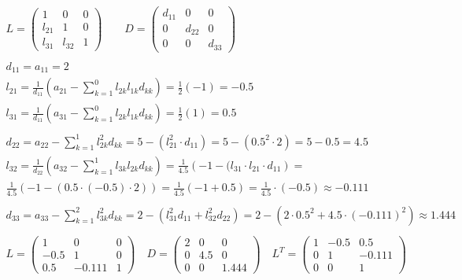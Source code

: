\documentclass[a4paper,fleqn,12pt]{article}
\begin{document}
\begin{gather*}
L = \begin{pmatrix}
1 & 0 & 0 \\
l_{21}& 1& 0 \\
l_{31} & l_{32} & 1
\end{pmatrix} \qquad 
D = \begin{pmatrix}
d_{11} & 0 & 0 \\
0 & d_{22} & 0 \\
0 & 0 & d_{33}
\end{pmatrix} \\ \\
d_{11} = a_{11} = 2 \\
l_{21} = \frac{1}{d_{11}} \left( a_{21} - \sum_{k=1} ^0 l_{2k}l_{1k}d_{kk} \right) = \frac{1}{2} (-1) = -0.5 \\
l_{31} = \frac{1}{d_{11}} \left( a_{31} - \sum_{k=1} ^0 l_{2k}l_{1k}d_{kk} \right) = \frac{1}{2} (1) = 0.5 \\
\\
d_{22} = a_{22} - \sum_{k=1} ^1 l_{2k} ^2 d_{kk} = 5 - (l_{21} ^2 \cdot d_{11} ) = 5 - (0.5^2 \cdot 2 ) = 5-0.5 = 4.5 \\ 
l_{32} = \frac{1}{d_{22}} \left( a_{32} - \sum_{k=1} ^1 l_{3k}l_{2k}d_{kk} \right) = \frac{1}{4.5} \left(-1 - (l_{31}\cdot l_{21}\cdot d_{11} \right) = \\
\frac{1}{4.5} (-1 -(0.5\cdot (-0.5) \cdot 2)) = \frac{1}{4.5} (-1 + 0.5) = \frac{1}{4.5} \cdot (-0.5) \approx -0.111 \\
\\
d_{33} = a_{33} - \sum_{k=1} ^2 l_{3k} ^2 d_{kk} = 2 - (l_{31} ^2 d_{11} + l_{32} ^2 d_{22}) = 2 - (2 \cdot 0.5^2 + 4.5 \cdot (-0.111)^2 ) \approx 1.444 \\
\\
L = \begin{pmatrix}
1 & 0 & 0 \\
-0.5& 1& 0 \\
0.5 &-0.111 & 1
\end{pmatrix} \quad 
D = \begin{pmatrix}
2 & 0 & 0 \\
0 & 4.5 & 0 \\
0 & 0 & 1.444
\end{pmatrix} \quad 
L^T = \begin{pmatrix}
1 & -0.5 & 0.5 \\
0 & 1& -0.111\\ 
0 &0 & 1
\end{pmatrix} 
\end{gather*}
\newpage
\end{document}
